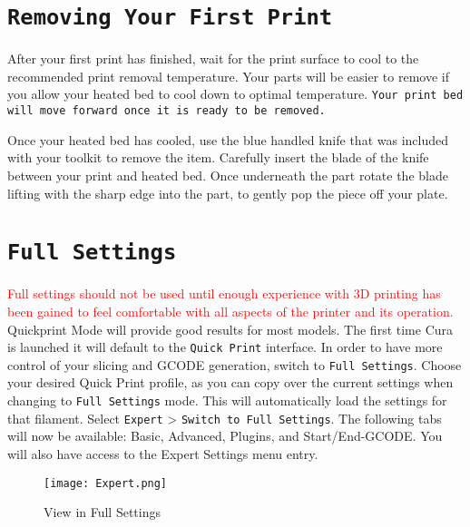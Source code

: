 \section{\texttt{Removing Your First Print}}
After your first print has finished, wait for the print surface to cool to the recommended print removal temperature.  Your parts will be easier to remove if you allow your heated bed to cool down to optimal temperature. \texttt{Your print bed will move forward once it is ready to be removed.}

Once your heated bed has cooled, use the blue handled knife that was included with your toolkit to remove the item. Carefully insert the blade of the knife between your print and heated bed. Once underneath the part rotate the blade lifting with the sharp edge into the part, to gently pop the piece off your plate.

\section{\texttt{Full Settings}}
\textcolor{red}{Full settings should not be used until enough experience with 3D printing has been gained to feel comfortable with all aspects of the printer and its operation.} Quickprint Mode will provide good results for most models.
The first time Cura is launched it will default to the \texttt{Quick Print} interface. In order to have more control of your slicing and GCODE generation, switch to \texttt{Full Settings}. Choose your desired Quick Print profile, as you can copy over the current settings when changing to \texttt{Full Settings} mode. This will automatically load the settings for that filament. Select \texttt{Expert} > \texttt{Switch to Full Settings}. The following tabs will now be available: Basic, Advanced, Plugins, and Start/End-GCODE. You will also have access to the Expert Settings menu entry. 
\begin{figure}[H]
\centering
\texttt{[image: Expert.png]}
\caption{View in Full Settings}
\label{fig:Full Settings View}
\end{figure}

